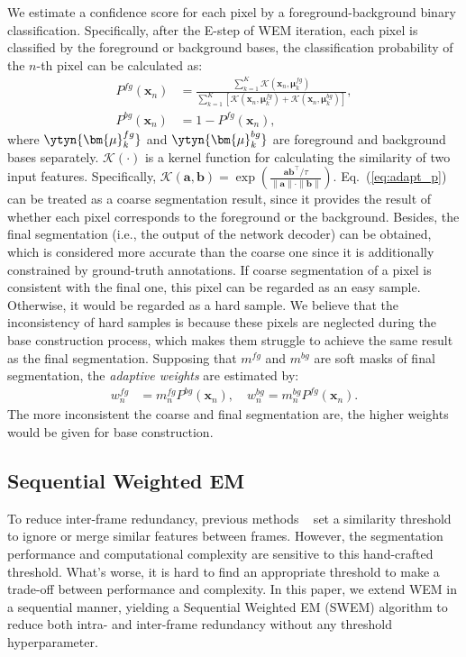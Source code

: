 We estimate a confidence score for each pixel by a foreground-background binary classification. Specifically, after the E-step of WEM iteration, each pixel is classified by the foreground or background bases, the classification probability of the $n$-th pixel can be calculated as:
\begin{equation}
\begin{split}
P^{fg}(\mathbf{x}_n) &= \frac{\sum_{k=1}^{K} \mathcal{K}(\mathbf{x}_n, \bm{\mu}^{fg}_k)}{\sum_{k=1}^{K} [\mathcal{K}(\mathbf{x}_n, \bm{\mu}^{fg}_k)+ \mathcal{K}(\mathbf{x}_n, \bm{\mu}^{bg}_k)]}, \\
P^{bg}(\mathbf{x}_n) &= 1 - P^{fg}(\mathbf{x}_n),
\end{split}
\label{eq:adapt_p}
\end{equation}
where $\ytyn{\bm{\mu}^{fg}_k}$ and $\ytyn{\bm{\mu}^{bg}_k}$ are foreground and background bases separately. $\mathcal{K}(\cdot)$ is a kernel function for calculating the similarity of two input features. Specifically, $\mathcal{K}(\mathbf{a}, \mathbf{b})=\exp(\frac{\mathbf{a}\mathbf{b}^{\top}/\tau}{\|\mathbf{a}\|\cdot \|\mathbf{b}\|})$. Eq.~(\ref{eq:adapt_p}) can be treated as a coarse segmentation result, since it provides the result of whether each pixel corresponds to the foreground or the background. Besides, the final segmentation (i.e., the output of the network decoder) can be obtained, which is considered more accurate than the coarse one since it is additionally constrained by ground-truth annotations. If coarse segmentation of a pixel is consistent with the final one, this pixel can be regarded as an easy sample. Otherwise, it would be regarded as a hard sample. We believe that the inconsistency of hard samples is because these pixels are neglected during the base construction process, which makes them struggle to achieve the same result as the final segmentation.
Supposing that $m^{fg}$ and $m^{bg}$ are soft masks of final segmentation, the \textit{adaptive weights} are estimated by:
\begin{equation}
\begin{split}
w^{fg}_n &= m^{fg}_n P^{bg}(\mathbf{x}_n),\quad w^{bg}_n = m^{bg}_n P^{fg}(\mathbf{x}_n).
\end{split}
\label{eq:adapt_w}
\end{equation}
The more inconsistent the coarse and final segmentation are, the higher weights would be given for base construction. 

\subsection{Sequential Weighted EM}
To reduce inter-frame redundancy, previous methods  ~\cite{liang2020video,wang2021swiftnet} set a similarity threshold to ignore or merge similar features between frames. However, the segmentation performance and computational complexity are sensitive to this hand-crafted threshold. What's worse, it is hard to find an appropriate threshold to make a trade-off between performance and complexity. In this paper, we extend WEM in a sequential manner, yielding a Sequential Weighted EM (SWEM) algorithm to reduce both intra- and inter-frame redundancy without any threshold hyperparameter. 

